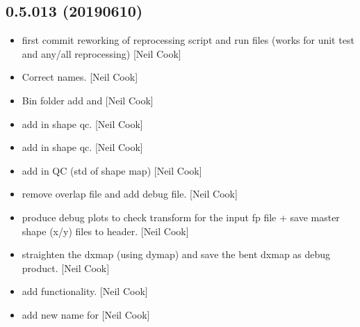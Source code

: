 \documentclass[a4paper,10pt,english]{report}
\begin{document}
\subsection{0.5.013 (2019\sphinxhyphen{}06\sphinxhyphen{}10)}
\label{\detokenize{misc/changelog:id143}}\begin{itemize}
\item {} 
 \sphinxhyphen{} first commit reworking of reprocessing script and
run files (works for unit test and any/all reprocessing) {[}Neil Cook{]}

\item {} 
Correct names. {[}Neil Cook{]}

\item {} 
Bin folder \sphinxhyphen{} add  and  {[}Neil Cook{]}

\item {} 
 \sphinxhyphen{} add in shape qc. {[}Neil Cook{]}

\item {} 
 \sphinxhyphen{} add in shape qc. {[}Neil Cook{]}

\item {} 
 \sphinxhyphen{} add in QC (std of shape map) {[}Neil Cook{]}

\item {} 
 \sphinxhyphen{} remove overlap file and add 
debug file. {[}Neil Cook{]}

\item {} 
 \sphinxhyphen{} produce debug plots to check transform for the
input fp file + save master shape (x/y) files to header. {[}Neil Cook{]}

\item {} 
 \sphinxhyphen{} straighten the dxmap (using dymap) and
save the bent dxmap as debug product. {[}Neil Cook{]}

\item {} 
 \sphinxhyphen{} add  functionality. {[}Neil Cook{]}

\item {} 
 \sphinxhyphen{} add new name for 
 {[}Neil Cook{]}


\end{itemize}
\end{document}
